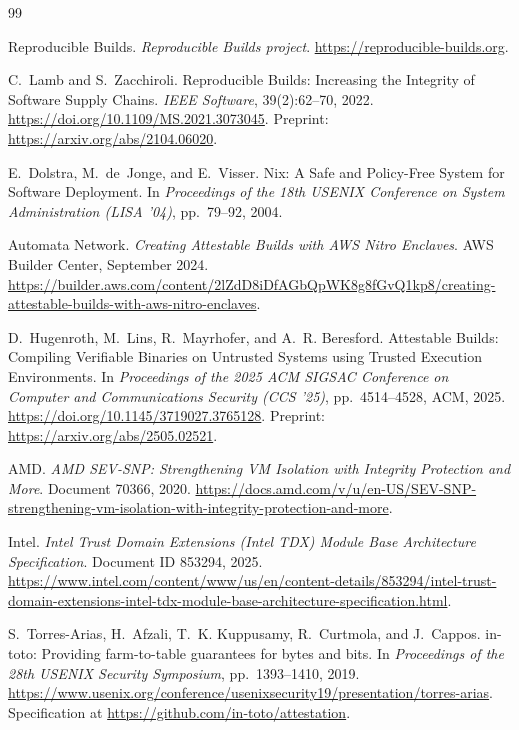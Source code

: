 \documentclass[11pt]{article}
\begin{document}
\begin{thebibliography}{99}

Reproducible Builds.
\newblock \emph{Reproducible Builds project}.
\newblock \url{https://reproducible-builds.org}.

C.~Lamb and S.~Zacchiroli.
\newblock Reproducible Builds: Increasing the Integrity of Software Supply Chains.
\newblock \emph{IEEE Software}, 39(2):62--70, 2022.
\newblock \url{https://doi.org/10.1109/MS.2021.3073045}. Preprint: \url{https://arxiv.org/abs/2104.06020}.

E.~Dolstra, M.~de~Jonge, and E.~Visser.
\newblock Nix: A Safe and Policy-Free System for Software Deployment.
\newblock In \emph{Proceedings of the 18th USENIX Conference on System Administration (LISA '04)}, pp.~79--92, 2004.

Automata Network.
\newblock \emph{Creating Attestable Builds with AWS Nitro Enclaves}.
\newblock AWS Builder Center, September 2024.
\newblock \url{https://builder.aws.com/content/2lZdD8iDfAGbQpWK8g8fGvQ1kp8/creating-attestable-builds-with-aws-nitro-enclaves}.

D.~Hugenroth, M.~Lins, R.~Mayrhofer, and A.~R. Beresford.
\newblock Attestable Builds: Compiling Verifiable Binaries on Untrusted Systems using Trusted Execution Environments.
\newblock In \emph{Proceedings of the 2025 ACM SIGSAC Conference on Computer and Communications Security (CCS '25)}, pp.~4514--4528, ACM, 2025.
\newblock \url{https://doi.org/10.1145/3719027.3765128}. Preprint: \url{https://arxiv.org/abs/2505.02521}.

AMD.
\newblock \emph{AMD SEV-SNP: Strengthening VM Isolation with Integrity Protection and More}.
\newblock Document 70366, 2020.
\newblock \url{https://docs.amd.com/v/u/en-US/SEV-SNP-strengthening-vm-isolation-with-integrity-protection-and-more}.

Intel.
\newblock \emph{Intel Trust Domain Extensions (Intel TDX) Module Base Architecture Specification}.
\newblock Document ID 853294, 2025.
\newblock \url{https://www.intel.com/content/www/us/en/content-details/853294/intel-trust-domain-extensions-intel-tdx-module-base-architecture-specification.html}.

S.~Torres-Arias, H.~Afzali, T.~K. Kuppusamy, R.~Curtmola, and J.~Cappos.
\newblock in-toto: Providing farm-to-table guarantees for bytes and bits.
\newblock In \emph{Proceedings of the 28th USENIX Security Symposium}, pp.~1393--1410, 2019.
\newblock \url{https://www.usenix.org/conference/usenixsecurity19/presentation/torres-arias}. Specification at \url{https://github.com/in-toto/attestation}.


\end{thebibliography}
\end{document}
